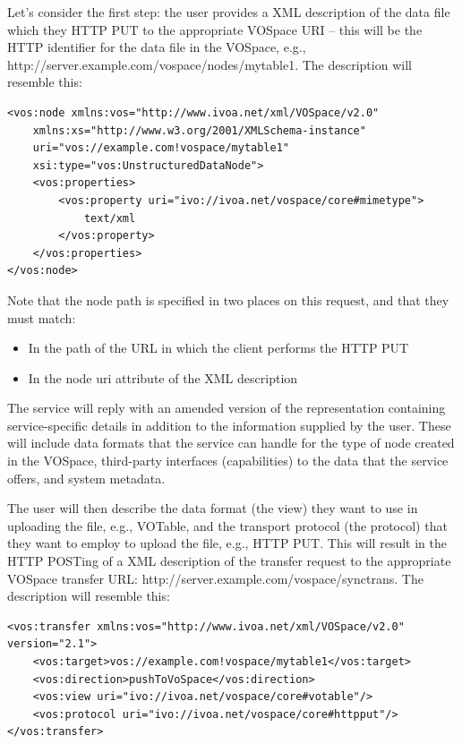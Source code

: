 \documentclass[11pt,a4paper]{ivoa}
\begin{document}
Let's consider the first step: the user provides a XML description of the data file which they HTTP PUT to the appropriate VOSpace URI -- this will be the HTTP identifier for the data file in the VOSpace, e.g., http://server.example.com/vospace/nodes/mytable1. The description will resemble this:

\begin{lstlisting}
<vos:node xmlns:vos="http://www.ivoa.net/xml/VOSpace/v2.0"
    xmlns:xs="http://www.w3.org/2001/XMLSchema-instance" 
    uri="vos://example.com!vospace/mytable1"
    xsi:type="vos:UnstructuredDataNode">  
    <vos:properties> 
        <vos:property uri="ivo://ivoa.net/vospace/core#mimetype">
            text/xml
        </vos:property>     
    </vos:properties> 
</vos:node> 
\end{lstlisting}
\noindent
Note that the node path is specified in two places on this request, and that they must match:
\begin{itemize}
   \item In the path of the URL in which the client performs the HTTP PUT
   \item In the node uri attribute of the XML description
\end{itemize}

The service will reply with an amended version of the representation containing service-specific details in addition to the information supplied by the user. These will include data formats that the service can handle for the type of node created in the VOSpace, third-party interfaces (capabilities) to the data that the service offers, and system metadata.

The user will then describe the data format (the view) they want to use in uploading the file, e.g., VOTable, and the transport protocol (the protocol) that they want to employ to upload the file, e.g., HTTP PUT. This will result in the HTTP POSTing of a XML description of the transfer request to the appropriate VOSpace transfer URL:  http://server.example.com/vospace/synctrans. The description will resemble this:

\begin{lstlisting}
<vos:transfer xmlns:vos="http://www.ivoa.net/xml/VOSpace/v2.0" version="2.1">
    <vos:target>vos://example.com!vospace/mytable1</vos:target>
    <vos:direction>pushToVoSpace</vos:direction> 
    <vos:view uri="ivo://ivoa.net/vospace/core#votable"/> 
    <vos:protocol uri="ivo://ivoa.net/vospace/core#httpput"/>  
</vos:transfer>
\end{lstlisting}
\end{document}
